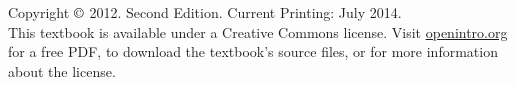 \chapter*{}
\vfill

\noindent Copyright $\copyright$ 2012. Second Edition. Current Printing: July 2014. \\

\noindent This textbook is available under a Creative Commons license. Visit \href{http://www.openintro.org/stat/textbook.php}{openintro.org} for a free PDF, to download the textbook's source files, or for more information about the license. \\


